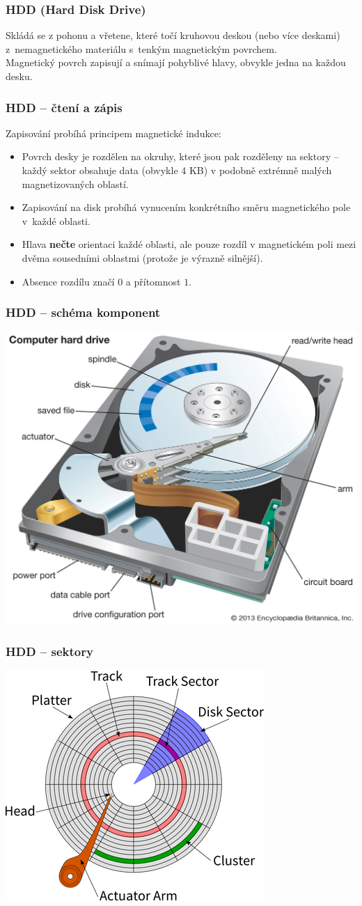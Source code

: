 \documentclass[aspectratio=169,11pt,svgnames,handout]{beamer}
\begin{document}
\begin{frame}
 \frametitle{HDD (\textbf{H}ard \textbf{D}isk \textbf{D}rive)}
 Skládá se z pohonu a vřetene, které točí kruhovou deskou (nebo více deskami)
 z~nemagnetického materiálu s~tenkým magnetickým povrchem.\\
 \pause
 Magnetický povrch zapisují a snímají pohyblivé hlavy, obvykle jedna na každou
 desku.
\end{frame}

\begin{frame}
 \frametitle{HDD -- čtení a zápis}
 Zapisování probíhá principem magnetické indukce:
 \begin{itemize}[label=\textbullet]
  \item Povrch desky je rozdělen na okruhy, které jsou pak rozděleny na sektory
   -- každý sektor obsahuje data (obvykle 4 KB) v podobně extrémně malých
   magnetizovaných oblastí.
  \pause
  \item Zapisování na disk probíhá vynucením konkrétního směru magnetického pole
   v~každé oblasti.
   \pause
  \item Hlava \textbf{nečte} orientaci každé oblasti, ale pouze rozdíl v
   magnetickém poli mezi dvěma sousedními oblastmi (protože je výrazně silnější).
  \pause
  \item Absence rozdílu značí $0$ a přítomnost $1$.
 \end{itemize}
\end{frame}

\begin{frame}
 \frametitle{HDD -- schéma komponent}
 \begin{center}
  \includegraphics[width=.5\textwidth]{hdd_big}
 \end{center}
\end{frame}

\begin{frame}
 \frametitle{HDD -- sektory}
 \begin{center}
  \includegraphics[width=.5\textwidth]{hdd_sector}
 \end{center}
\end{frame}
\end{document}
